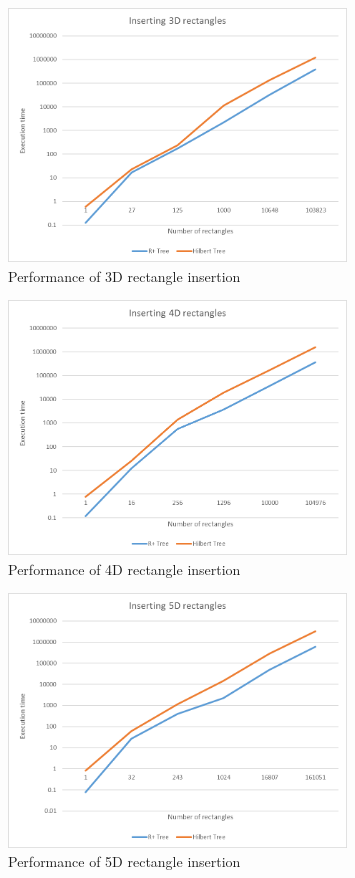 \documentclass[11pt, a4paper, oneside]{article}
\begin{document}
\begin{figure}[H]
  \centering
    \includegraphics[width=0.8\textwidth]{img/insert3D}
      \caption{Performance of 3D rectangle insertion}
  \label{fig:insert3D}
\end{figure}

\begin{figure}[H]
  \centering
    \includegraphics[width=0.8\textwidth]{img/insert4D}
      \caption{Performance of 4D rectangle insertion}
  \label{fig:insert4D}
\end{figure}

\begin{figure}[H]
  \centering
    \includegraphics[width=0.8\textwidth]{img/insert5D}
      \caption{Performance of 5D rectangle insertion}
  \label{fig:insert5D}
\end{figure}
\end{document}

